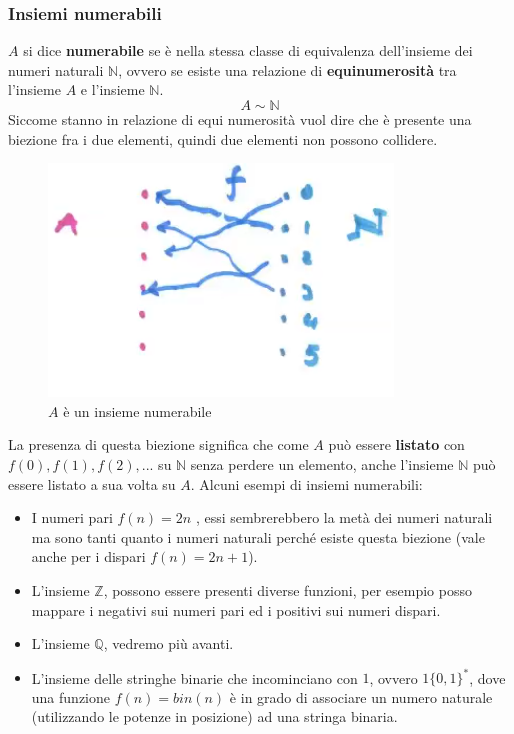 \documentclass{article}
\begin{document}
\subsubsection{Insiemi numerabili}
$A$ si dice \textbf{numerabile} se è nella stessa classe di equivalenza dell'insieme dei numeri naturali
$\mathbb{N}$, ovvero se esiste una relazione di \textbf{equinumerosità} tra l'insieme $A$ e l'insieme $\mathbb{N}$.
$$A\sim\mathbb{N}$$
Siccome stanno in relazione di equi numerosità
vuol dire che è presente una biezione fra i due elementi, quindi due elementi non possono collidere.
\begin{figure}[H]
    \centering
    \includegraphics[scale=0.6]{images/A_numerabile_N.png}
    \caption{$A$ è un insieme numerabile}
\end{figure}
La presenza di questa biezione significa che come $A$ può essere \textbf{listato} con
$f(0),f(1),f(2),...$ su $\mathbb{N}$ senza perdere un elemento, anche l'insieme $\mathbb{N}$ può essere
listato a sua volta su $A$.
Alcuni esempi di insiemi numerabili:
\begin{itemize}
    \item I numeri pari $f(n)=2n$ , essi sembrerebbero la metà dei numeri naturali ma sono tanti quanto i numeri
          naturali perché esiste questa biezione (vale anche per i dispari $f(n)=2n+1$).
    \item L'insieme $\mathbb{Z}$, possono essere presenti diverse funzioni, per esempio
          posso mappare i negativi sui numeri pari ed i positivi sui numeri dispari.
    \item L'insieme $\mathbb{Q}$, vedremo più avanti.
    \item L'insieme delle stringhe binarie che incominciano con $1$, ovvero $1\{0,1\}^*$,
          dove una funzione $f(n)=bin(n)$ è in grado di associare un numero naturale (utilizzando
          le potenze in posizione) ad una stringa binaria.
\end{itemize}
\end{document}
